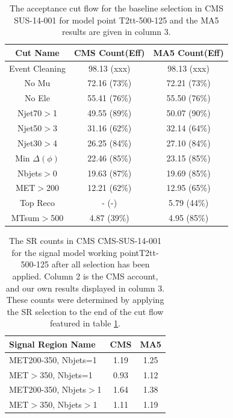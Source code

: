 \begin{table}
    \centering
    \caption{The acceptance cut flow for the baseline selection in CMS SUS-14-001 for
    model point T2tt-500-125 and the MA5 results are given in column 3.}
    \label{table:T2tt-500-125}
    \begin{tabular}{  c | c | c  }
    \hline
    Cut Name & CMS Count(Eff) & MA5 Count(Eff)\\
    \hline
        Event Cleaning & 98.13 (xxx) & 98.13 (xxx)\\
    No Mu & 72.16 (73\%) & 72.21 (73\%)\\
    No Ele & 55.41 (76\%) & 55.50 (76\%)\\
    Njet70$>$1 & 49.55 (89\%) & 50.07 (90\%)\\
    Njet50$>$3 & 31.16 (62\%) & 32.14 (64\%)\\
    Njet30$>$4 & 26.25 (84\%) & 27.10 (84\%)\\
    Min $\Delta(\phi)$ & 22.46 (85\%) & 23.15 (85\%)\\
    Nbjets$>$0 & 19.63 (87\%) & 19.69 (85\%)\\
    MET$>$200 & 12.21 (62\%) & 12.95 (65\%)\\
    Top Reco & - (-) & 5.79 (44\%)\\
    MTsum$>$500 & 4.87 (39\%) & 4.95 (85\%)\\
\hline
    \end{tabular}
    
    \end{table}

    \begin{table}
    \centering
    \caption{The SR counts in CMS CMS-SUS-14-001 for
    the signal model working pointT2tt-500-125 after all selection has been applied. Column 2 is the CMS account,
    and our own results displayed in column 3. These counts were determined by applying the SR selection to the end of the cut flow featured in table \ref{table:T2tt-500-125}.}
    \begin{tabular}{  l | c | c  }
    \hline
    Signal Region Name & CMS & MA5\\
    \hline
    MET200-350,  Nbjets=1 & 1.19 & 1.25\\ 
 \hline 
MET$>$350,  Nbjets=1 & 0.93 & 1.12\\ 
 \hline 
MET200-350,  Nbjets$>$1 & 1.64 & 1.38\\ 
 \hline 
MET$>$350,  Nbjets$>$1 & 1.11 & 1.19\\ 
 \hline 
\hline
    \end{tabular}
    
    \end{table}



